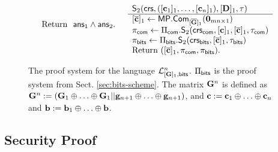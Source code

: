 \begin{figure}
$$\begin{array}{ll}
\begin{array}{l}
\text{Return } \ \mathsf{ans}_1\wedge\mathsf{ans}_2.
\\
\\
\end{array}
&
\begin{array}{l}
{\mathsf{S}_2(\mathsf{crs},([\mathbf{c}_1]_1,\ldots,[\mathbf{c}_n]_1),[\mathbf{{D}}]_1,\tau)}\\
\hline
{[\overline{\mathbf{c}}]_1 \gets \mathsf{MP}.\mathsf{Com}_{[\overline{\mathbf{{G}}}]_1}(\mathbf{0}_{mn\times 1})}\\
\pi_{\mathsf{com}}\gets \Pi_{\mathsf{com}}.\mathsf{S}_2(\mathsf{crs}_{\mathsf{com}},[\mathbf{c}]_1,[\overline{\mathbf{c}}]_1,\tau_{\mathsf{com}})\\
\pi_{\mathsf{bits}} \gets \Pi_{\mathsf{bits}}.\mathsf{S}_2(\mathsf{crs}_{\mathsf{bits}},[\overline{\mathbf{c}}]_1,\tau_{\mathsf{bits}})\\
\text{Return }  ([\overline{\mathbf{c}}]_1,\pi_{\mathsf{com}}, \pi_{\mathsf{bits}}).
\end{array}
\end{array}$$
\caption{The proof system for the language $\mathcal{L}_{[\mathbf{{G}}]_1,\mathsf{bits}}^n$. $\Pi_{\mathsf{bits}}$ is the proof system from Sect. \ref{sec:bits-scheme}. The matrix $\mathbf{{G}}^n$ is defined as
$\mathbf{{G}}^n:=(\mathbf{{G}}_1\oplus\ldots\oplus\mathbf{{G}}_1||\mathbf{g}_{n+1}\oplus\ldots\oplus\mathbf{g}_{n+1})$, and $\mathbf{c}:=\mathbf{c}_1\oplus\ldots\oplus\mathbf{c}_n$ and $\mathbf{b}:=\mathbf{b}_1\oplus\ldots\oplus\mathbf{b}$.
\label{fig:bitsn}
}
\end{figure}



\subsection{Security Proof}

